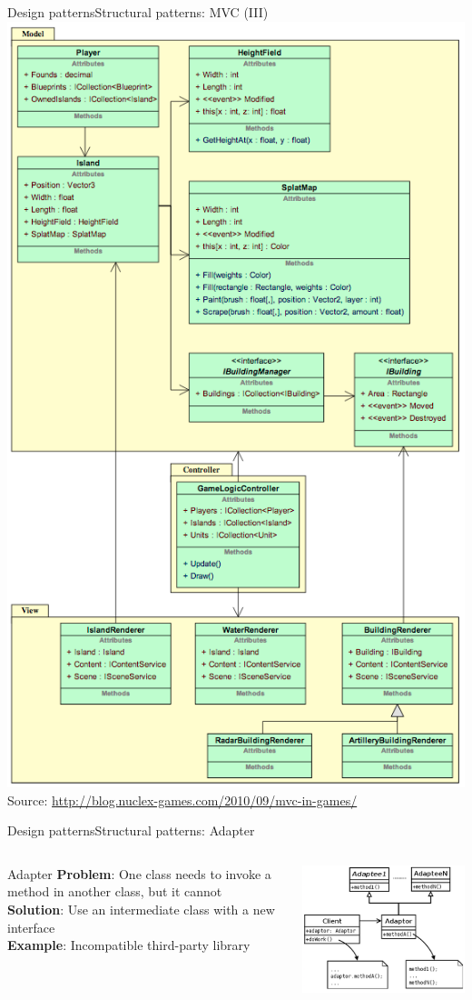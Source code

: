 \documentclass[10pt,compress]{beamer} %
\begin{document}
\begin{frame}[plain]{Design patterns}{Structural patterns: MVC (III)}
	\centering\includegraphics[width=0.4\linewidth]{figs/mvcgames}\\
	\centering \scriptsize{Source: \url{http://blog.nuclex-games.com/2010/09/mvc-in-games/}}
\end{frame}

\begin{frame}{Design patterns}{Structural patterns: Adapter}
    \begin{columns}
	   \begin{block}{Adapter}
			\textbf{Problem}: One class needs to invoke a method in another class, but it cannot\\
			\textbf{Solution}: Use an intermediate class with a new interface\\
			\textbf{Example}: Incompatible third-party library\\
		\end{block}
			\centering\includegraphics[width=\linewidth]{figs/adapter}\\
	\end{columns}
\end{frame}
\end{document}
